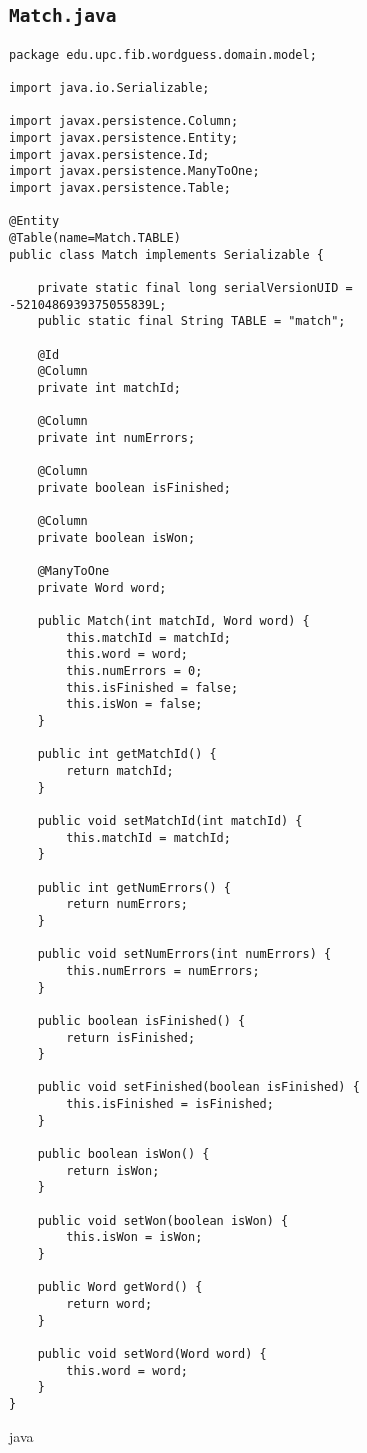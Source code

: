 \subsection{\texttt{Match.java}}
\begin{verbatim}
package edu.upc.fib.wordguess.domain.model;

import java.io.Serializable;

import javax.persistence.Column;
import javax.persistence.Entity;
import javax.persistence.Id;
import javax.persistence.ManyToOne;
import javax.persistence.Table;

@Entity
@Table(name=Match.TABLE)
public class Match implements Serializable {

    private static final long serialVersionUID = -5210486939375055839L;
    public static final String TABLE = "match";

    @Id
    @Column
    private int matchId;

    @Column
    private int numErrors;

    @Column
    private boolean isFinished;

    @Column
    private boolean isWon;

    @ManyToOne
    private Word word;

    public Match(int matchId, Word word) {
        this.matchId = matchId;
        this.word = word;
        this.numErrors = 0;
        this.isFinished = false;
        this.isWon = false;
    }

    public int getMatchId() {
        return matchId;
    }

    public void setMatchId(int matchId) {
        this.matchId = matchId;
    }

    public int getNumErrors() {
        return numErrors;
    }

    public void setNumErrors(int numErrors) {
        this.numErrors = numErrors;
    }

    public boolean isFinished() {
        return isFinished;
    }

    public void setFinished(boolean isFinished) {
        this.isFinished = isFinished;
    }

    public boolean isWon() {
        return isWon;
    }

    public void setWon(boolean isWon) {
        this.isWon = isWon;
    }

    public Word getWord() {
        return word;
    }

    public void setWord(Word word) {
        this.word = word;
    }
}
\end{verbatim}{java}


